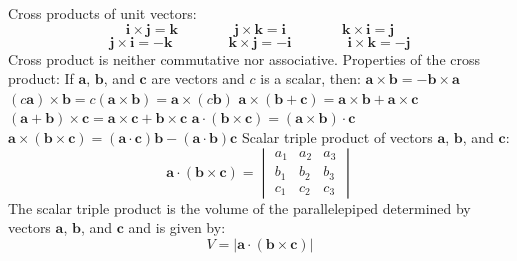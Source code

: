 \documentclass{article}
\begin{document}
        \begin{outline}
        \1 Cross products of unit vectors: \[\mathbf{i\times j=k} \qquad \qquad \mathbf{j\times k=i} \qquad \qquad \mathbf{k\times i=j}\]\[\mathbf{j\times i=-k} \qquad \qquad \mathbf{k\times j=-i} \qquad \qquad \mathbf{i\times k=-j}\]
        \1 Cross product is neither commutative nor associative. 
        \1 Properties of the cross product: If \(\mathbf a\), \(\mathbf b\), and \(\mathbf c\) are vectors and \(c\) is a scalar, then: 
            \2 \(\mathbf{a\times b=-b\times a}\)
            \2 \((c\mathbf a)\times \mathbf b=c(\mathbf{a\times b})=\mathbf a\times(c\mathbf b)\)
            \2 \(\mathbf{a}\times(\mathbf{b+c})=\mathbf{a\times b+a\times c}\)
            \2 \((\mathbf{a+b})\times \mathbf c=\mathbf{a\times c+b\times c}\)
            \2 \(\mathbf{a\cdot(b\times c)}=\mathbf{(a\times b)\cdot c}\)
            \2 \(\mathbf{a\times(b\times c)}=\mathbf{(a\cdot c)b-(a\cdot b)c}\)
        \1 Scalar triple product of vectors \(\mathbf a\), \(\mathbf b\), and \(\mathbf c\): \[\mathbf{a\cdot(b\times c)}=\begin{vmatrix}
            a_1 & a_2 & a_3\\
            b_1 & b_2 & b_3 \\
            c_1 & c_2 & c_3
        \end{vmatrix}\]
        \1 The scalar triple product is the volume of the parallelepiped determined by vectors \(\mathbf a\), \(\mathbf b\), and \(\mathbf c\) and is given by: \[V=|\mathbf{a\cdot(b\times c)}|\]

    \end{outline}
    
\end{document}
